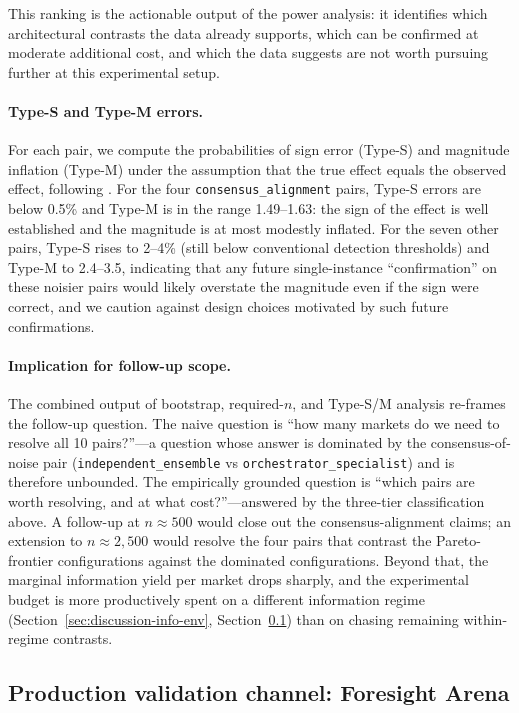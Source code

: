 \documentclass[11pt]{article}
\begin{document}
This ranking is the actionable output of the power analysis: it identifies which architectural contrasts the data already supports, which can be confirmed at moderate additional cost, and which the data suggests are not worth pursuing further at this experimental setup.

\paragraph{Type-S and Type-M errors.}
For each pair, we compute the probabilities of sign error (Type-S) and magnitude inflation (Type-M) under the assumption that the true effect equals the observed effect, following \citet{gelman2014beyond}. For the four \texttt{consensus\_alignment} pairs, Type-S errors are below 0.5\% and Type-M is in the range 1.49--1.63: the sign of the effect is well established and the magnitude is at most modestly inflated. For the seven other pairs, Type-S rises to 2--4\% (still below conventional detection thresholds) and Type-M to 2.4--3.5, indicating that any future single-instance ``confirmation'' on these noisier pairs would likely overstate the magnitude even if the sign were correct, and we caution against design choices motivated by such future confirmations.

\paragraph{Implication for follow-up scope.}
The combined output of bootstrap, required-$n$, and Type-S/M analysis re-frames the follow-up question. The naive question is ``how many markets do we need to resolve all 10 pairs?''---a question whose answer is dominated by the consensus-of-noise pair (\texttt{independent\_ensemble} vs \texttt{orchestrator\_specialist}) and is therefore unbounded. The empirically grounded question is ``which pairs are worth resolving, and at what cost?''---answered by the three-tier classification above. A follow-up at $n \approx 500$ would close out the consensus-alignment claims; an extension to $n \approx 2{,}500$ would resolve the four pairs that contrast the Pareto-frontier configurations against the dominated configurations. Beyond that, the marginal information yield per market drops sharply, and the experimental budget is more productively spent on a different information regime (Section~\ref{sec:discussion-info-env}, Section~\ref{sec:results-replication}) than on chasing remaining within-regime contrasts.

\subsection{Production validation channel: Foresight Arena}
\label{sec:results-replication}
\end{document}
